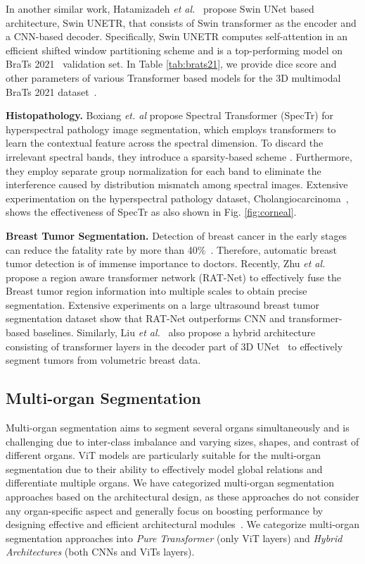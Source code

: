 \documentclass[10pt,journal,compsoc]{IEEEtran}
\begin{document}
In another similar work, Hatamizadeh \textit{et al.}~\cite{hatamizadeh2022swin} propose Swin UNet based architecture, Swin UNETR, that consists of Swin transformer as the encoder and a CNN-based decoder. Specifically,  Swin UNETR computes self-attention in an efficient shifted window partitioning scheme and is a top-performing model on BraTs 2021~\cite{baid2021rsna} validation set. In Table \ref{tab:brats21}, we provide dice score and other parameters of various Transformer based models for the 3D multimodal BraTs 2021 dataset~\cite{baid2021rsna}.

 {{\textbf{Histopathology.}}}
Boxiang \textit{et. al} \cite{yun2021spectr} propose Spectral Transformer (SpecTr) for hyperspectral pathology image segmentation, which employs transformers to learn the contextual feature across the spectral dimension. To discard the irrelevant spectral bands, they introduce a sparsity-based scheme \cite{correia2019adaptively}. Furthermore, they employ separate group normalization for each band to eliminate the interference caused by distribution mismatch among spectral images. Extensive experimentation on the hyperspectral pathology dataset, Cholangiocarcinoma~\cite{zhang2019multidimensional}, shows the effectiveness of SpecTr as also shown in Fig. \ref{fig:corneal}.

 {{\textbf{Breast Tumor Segmentation.}}} Detection of breast cancer in the early stages can reduce the fatality rate by more than 40$\%$~\cite{huang2017breast}. Therefore, automatic breast tumor detection is of immense importance to doctors. Recently, Zhu \textit{et al.}~\cite{zhu2021region} propose a region aware transformer network (RAT-Net) to effectively fuse the Breast tumor region information into multiple scales to obtain precise segmentation. Extensive experiments on a large ultrasound breast tumor segmentation dataset show that RAT-Net outperforms CNN and transformer-based baselines.
Similarly, Liu \textit{et al.}~\cite{liu20213d} also propose a hybrid architecture consisting of transformer layers in the decoder part of 3D UNet~\cite{cciccek20163d} to effectively segment tumors from volumetric breast data.

\subsection{Multi-organ Segmentation}

Multi-organ segmentation aims to segment several organs simultaneously and is challenging due to inter-class imbalance and varying sizes, shapes, and contrast of different organs. ViT models are particularly suitable for the multi-organ segmentation due to their ability to effectively model global relations and differentiate multiple organs. We have categorized multi-organ segmentation approaches based on the architectural design, as these approaches do not consider any organ-specific aspect and generally focus on boosting performance by designing effective and efficient architectural modules~\cite{lei2020deep}. We categorize multi-organ segmentation approaches into \textit{Pure Transformer} (only ViT layers) and \textit{Hybrid Architectures} (both CNNs and ViTs layers).
\end{document}
